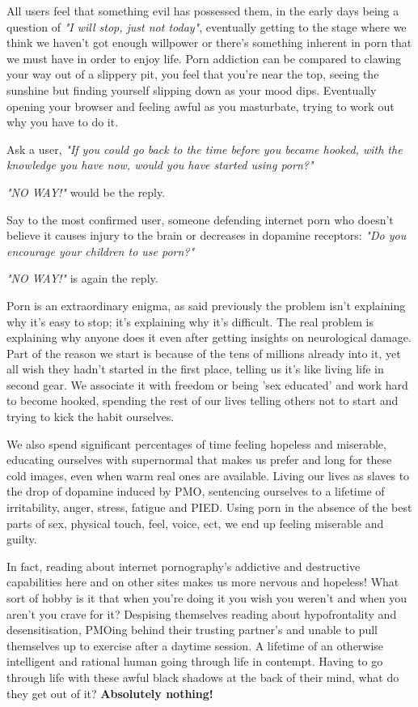 \documentclass[easypeasy.tex]{subfiles}
\begin{document}
All users feel that something evil has possessed them, in the early days being a question of \textit{"I will stop, just not today"}, eventually getting to the stage where we think we haven't got enough willpower or there's something inherent in porn that we must have in order to enjoy life. Porn addiction can be compared to clawing your way out of a slippery pit, you feel that you're near the top, seeing the sunshine but finding yourself slipping down as your mood dips. Eventually opening your browser and feeling awful as you masturbate, trying to work out why you have to do it.

Ask a user, \textit{"If you could go back to the time before you became hooked, with the knowledge you have now, would you have started using porn?"}

\textit{"NO WAY!"} would be the reply.

Say to the most confirmed user, someone defending internet porn who doesn't believe it causes injury to the brain or decreases in dopamine receptors: \textit{"Do you encourage your children to use porn?"}

\textit{"NO WAY!"} is again the reply.

Porn is an extraordinary enigma, as said previously the problem isn't explaining why it's easy to stop; it's explaining why it's difficult. The real problem is explaining why anyone does it even after getting insights on neurological damage. Part of the reason we start is because of the tens of millions already into it, yet all wish they hadn't started in the first place, telling us it's like living life in second gear. We associate it with freedom or being 'sex educated' and work hard to become hooked, spending the rest of our lives telling others not to start and trying to kick the habit ourselves.

We also spend significant percentages of time feeling hopeless and miserable, educating ourselves with supernormal that makes us prefer and long for these cold images, even when warm real ones are available. Living our lives as slaves to the drop of dopamine induced by PMO, sentencing ourselves to a lifetime of irritability, anger, stress, fatigue and PIED. Using porn in the absence of the best parts of sex, physical touch, feel, voice, ect, we end up feeling miserable and guilty.

In fact, reading about internet pornography's addictive and destructive capabilities here and on other sites makes us more nervous and hopeless! What sort of hobby is it that when you're doing it you wish you weren't and when you aren't you crave for it? Despising themselves reading about hypofrontality and desensitisation, PMOing behind their trusting partner's and unable to pull themselves up to exercise after a daytime session. A lifetime of an otherwise intelligent and rational human going through life in contempt. Having to go through life with these awful black shadows at the back of their mind, what do they get out of it? \textbf{Absolutely nothing!}
\end{document}
